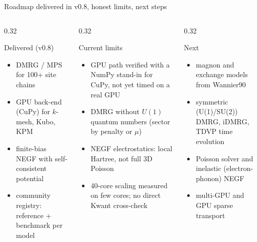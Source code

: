 \documentclass[aspectratio=169,11pt]{beamer}
\begin{document}
\begin{frame}{Roadmap delivered in v0.8, honest limits, next steps}
\begin{columns}[T]
\begin{column}{0.32\textwidth}
\begin{block}{Delivered (v0.8)}
\scriptsize
\begin{itemize}
\item DMRG / MPS for 100+ site chains
\item GPU back-end (CuPy) for $k$-mesh, Kubo, KPM
\item finite-bias NEGF with self-consistent potential
\item community registry: reference + benchmark per model
\end{itemize}
\end{block}
\end{column}
\begin{column}{0.32\textwidth}
\begin{block}{Current limits}
\scriptsize
\begin{itemize}
\item GPU path verified with a NumPy stand-in for CuPy, not yet timed on a real GPU
\item DMRG without $U(1)$ quantum numbers (sector by penalty or $\mu$)
\item NEGF electrostatics: local Hartree, not full 3D Poisson
\item 40-core scaling measured on few cores; no direct Kwant cross-check
\end{itemize}
\end{block}
\end{column}
\begin{column}{0.32\textwidth}
\begin{block}{Next}
\scriptsize
\begin{itemize}
\item magnon and exchange models from Wannier90
\item symmetric (U(1)/SU(2)) DMRG, iDMRG, TDVP time evolution
\item Poisson solver and inelastic (electron-phonon) NEGF
\item multi-GPU and GPU sparse transport
\end{itemize}
\end{block}
\end{column}
\end{columns}
\end{frame}
\end{document}

